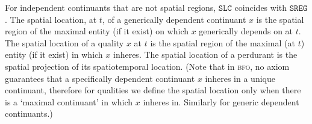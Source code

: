 \documentclass[ao]{iosart2x}
\newcommand{\pr}[1]{\mathtt{#1}}
\newcommand{\bfo}{{\textsc{bfo}}}
\newcommand {\SLCd} {\ensuremath{\pr{SLC}}}
\newcommand{\bfosregof}{\pr{SREG}}
\begin{document}
\vspace{6pt}
For independent continuants that are not spatial regions, $\SLCd$ coincides with $\bfosregof$. The spatial location, at $t$, of a generically dependent continuant $x$ is the spatial region of the maximal entity (if it exist) on which $x$ generically depends on at $t$.  The spatial location of a quality $x$ at $t$ is the spatial region of the maximal (at $t$) entity (if it exist) in which $x$ inheres. The spatial location of a perdurant is the spatial projection of its spatiotemporal location.  
(Note that in {\bfo}, no axiom guarantees that a specifically dependent continuant $x$ inheres in a unique continuant, therefore for qualities we define the spatial location only when there is a `maximal continuant' in which $x$ inheres in. Similarly for generic dependent continuants.)
\end{document}
